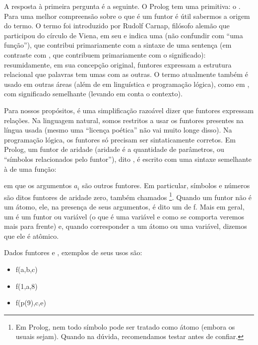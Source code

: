 \documentclass{article}
\begin{document}
A resposta à primeira pergunta é a seguinte. O Prolog tem uma primitiva: o . Para uma melhor compreensão sobre o que é um
funtor é útil sabermos a origem do termo. O termo  foi introduzido por Rudolf Carnap, filósofo alemão que
participou do círculo de Viena, em seu \cite{carnap} e indica uma 
(não confundir com ``uma função''), que contribui primariamente com a sintaxe de uma sentença (em contraste com ,
que contribuem primariamente com o significado): resumidamente, em sua concepção original, funtores expressam a estrutura
relacional que palavras tem umas com as outras. O termo atualmente também é usado em outras áreas (além de em linguística e
programação lógica), como em , com significado semelhante (levando em conta o contexto).

Para nossos propósitos, é uma simplificação razoável dizer que funtores expressam relações. Na linguagem natural, somos restritos a usar os funtores presentes na língua usada (mesmo uma ``licença poética'' não vai muito longe disso).
Na programação lógica, os funtores só precisam ser sintaticamente corretos. Em Prolog, um funtor
 de aridade  (aridade é a quantidade de parâmetros, ou ``símbolos relacionados pelo funtor''), dito
, é escrito com uma sintaxe semelhante à de uma função:


\noindent em que os argumentos $a_i$ são outros funtores. Em particular, símbolos e números são ditos funtores
de aridade zero, também chamados \footnote{Em Prolog, nem todo símbolo pode ser
  tratado como átomo (embora os usuais sejam). Quando na dúvida, recomendamos testar antes de
  confiar.}. Quando um funtor  não é um átomo, ele, na presença de seus argumentos,
é dito um  de  f. Mais em geral, um  é um funtor ou variável (o que é uma variável e como se comporta  veremos mais para frente) e, quando corresponder a um átomo ou uma variável, dizemos que ele é atômico.

Dados funtores  e , exemplos de seus usos são:

\begin{itemize}
  \item f(a,b,c)
  \item f(1,a,8)
  \item f(p(9),c,e)
\end{itemize}
\end{document}

